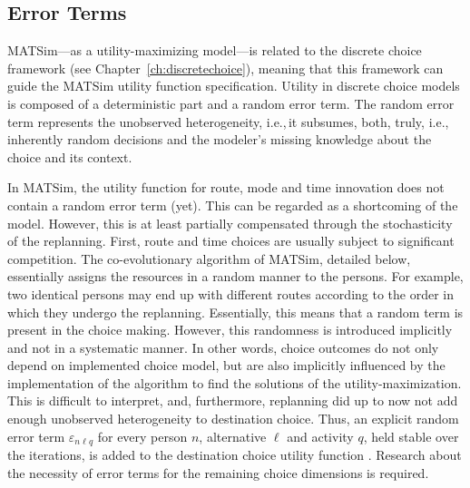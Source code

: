 \subsection{Error Terms}
\label{sec:errorterms}
MATSim---as a utility-maximizing model---is related to the discrete choice framework (see Chapter~\ref{ch:discretechoice}), meaning that this framework can guide the MATSim utility function specification. Utility in discrete choice models is composed of a deterministic part and a random error term. The random error term represents the unobserved heterogeneity, i.e.,\,it subsumes, both, truly, i.e.,\,inherently random decisions and the modeler's missing knowledge about the choice and its context. 

In MATSim, the utility function for route, mode and time innovation does not contain a random error term (yet). This can be regarded as a shortcoming of the model. However, this is at least partially compensated through the stochasticity of the replanning. First, route and time choices are usually subject to significant competition. The co-evolutionary algorithm of MATSim, detailed below, essentially assigns the resources in a random manner to the persons. For example, two identical persons may end up with different routes according to the order in which they undergo the replanning. Essentially, this means that a random term is present in the choice making. However, this randomness is introduced implicitly and not in a systematic manner. In other words, choice outcomes do not only depend on implemented choice model, but are also implicitly influenced by the implementation of the algorithm to find the solutions of the utility-maximization. This is difficult to interpret, and, furthermore, replanning did up to now not add enough unobserved heterogeneity to destination choice. Thus, an explicit random error term $\varepsilon_{n\ell q}$ for every person $n$, alternative $\ell$ and activity $q$, held stable over the iterations, is added to the destination choice utility function \citep[][]{Horni_PhDThesis_2013}. Research about the necessity of error terms for the remaining choice dimensions is required.

